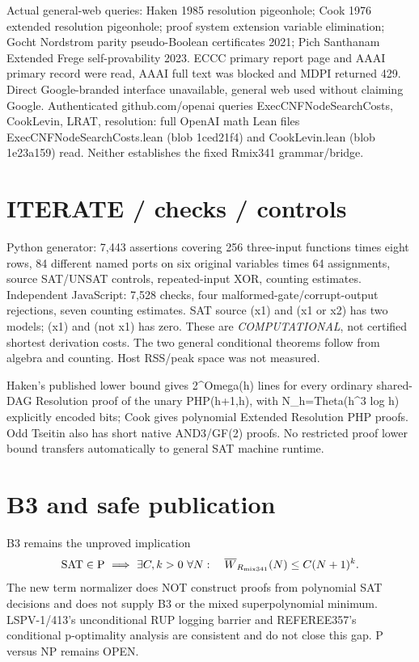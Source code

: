 \documentclass{article}
\begin{document}
Actual general-web queries: Haken 1985 resolution pigeonhole; Cook 1976 extended resolution pigeonhole; proof system extension variable elimination; Gocht Nordstrom parity pseudo-Boolean certificates 2021; Pich Santhanam Extended Frege self-provability 2023. ECCC primary report page and AAAI primary record were read, AAAI full text was blocked and MDPI returned 429. Direct Google-branded interface unavailable, general web used without claiming Google. Authenticated github.com/openai queries ExecCNFNodeSearchCosts, CookLevin, LRAT, resolution: full OpenAI math Lean files ExecCNFNodeSearchCosts.lean (blob 1ced21f4) and CookLevin.lean (blob 1e23a159) read. Neither establishes the fixed Rmix341 grammar/bridge.

\section*{ITERATE / checks / controls}
Python generator: 7,443 assertions covering 256 three-input functions times eight rows, 84 different named ports on six original variables times 64 assignments, source SAT/UNSAT controls, repeated-input XOR, counting estimates. Independent JavaScript: 7,528 checks, four malformed-gate/corrupt-output rejections, seven counting estimates. SAT source (x1) and (x1 or x2) has two models; (x1) and (not x1) has zero. These are \emph{COMPUTATIONAL}, not certified shortest derivation costs. The two general conditional theorems follow from algebra and counting. Host RSS/peak space was not measured.

Haken's published lower bound gives 2^{Omega(h)} lines for every ordinary shared-DAG Resolution proof of the unary PHP(h+1,h), with N_h=Theta(h^3 log h) explicitly encoded bits; Cook gives polynomial Extended Resolution PHP proofs. Odd Tseitin also has short native AND3/GF(2) proofs. No restricted proof lower bound transfers automatically to general SAT machine runtime.

\section*{B3 and safe publication}
B3 remains the unproved implication
\[
 {\rm SAT}\in{\rm P}\ \Longrightarrow\
 \exists C,k>0\ \forall N:\quad\overline W_{R_{\rm mix341}}(N)\le C(N+1)^k.
\]
The new term normalizer does NOT construct proofs from polynomial SAT decisions and does not supply B3 or the mixed superpolynomial minimum. LSPV-1/413's unconditional RUP logging barrier and REFEREE357's conditional p-optimality analysis are consistent and do not close this gap. P versus NP remains OPEN.
\end{document}
